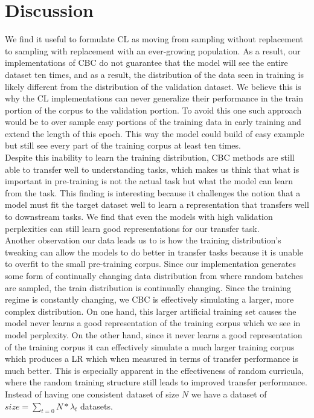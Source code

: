 \section{Discussion}
We find it useful to formulate CL as moving from sampling without replacement to sampling with replacement with an ever-growing population. As a result, our implementations of CBC do not guarantee that the model will see the entire dataset ten times, and as a result, the distribution of the data seen in training is likely different from the distribution of the validation dataset. We believe this is why the CL implementations can never generalize their performance in the train portion of the corpus to the validation portion. To avoid this one such approach would be to over sample easy portions of the training data in early training and extend the length of this epoch. This way the model could build of easy example but still see every part of the training corpus at least ten times. \\
Despite this inability to learn the training distribution, CBC methods are still able to transfer well to understanding tasks, which makes us think that what is important in pre-training is not the actual task but what the model can learn from the task. This finding is interesting because it challenges the notion that a model must fit the target dataset well to learn a representation that transfers well to downstream tasks. We find that even the models with high validation perplexities can still learn good representations for our transfer task. \\
Another observation our data leads us to is how the training distribution's tweaking can allow the models to do better in transfer tasks because it is unable to overfit to the small pre-training corpus. Since our implementation generates some form of continually changing data distribution from where random batches are sampled, the train distribution is continually changing. Since the training regime is constantly changing, we CBC is effectively simulating a larger, more complex distribution. On one hand, this larger artificial training set causes the model never learns a good representation of the training corpus which we see in model perplexity. On the other hand, since it never learns a good representation of the training corpus it can effectively simulate a much larger training corpus which produces a LR which when measured in terms of transfer performance is much better. This is especially apparent in the effectiveness of random curricula, where the random training structure still leads to improved transfer performance. Instead of having one consistent dataset of size $N$ we have a dataset of $size = \sum_{t=0} N * \lambda_t$ datasets.  \\
